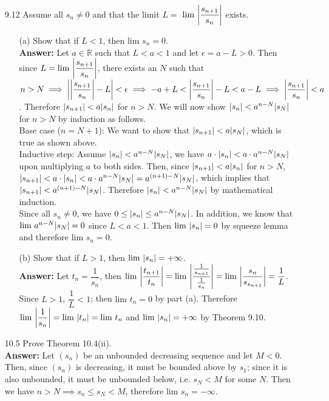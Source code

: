 \documentclass{article}
\begin{document}
\begin{itemize}
\begin{itemize}
            \end{itemize}
      \item [9.12] Assume all $s_n\neq 0$ and that the limit $L=$ $\text{lim }\abs{\dfrac{s_{n+1}}{s_n}}$ exists.
            \begin{itemize}
                  \item [(a)] Show that if $L<1$, then $\text{lim }s_n=0$.\\
                  \textbf{Answer: } Let $a\in\mathbb{R}$ such that $L<a<1$ and let $\epsilon=a-L>0$. Then since $L=\text{lim }\abs{\dfrac{s_{n+1}}{s_n}}$, there exists an $N$ such that $n>N\implies\abs{\abs{\dfrac{s_{n+1}}{s_n}}-L}<\epsilon\implies -a+L<\abs{\dfrac{s_{n+1}}{s_n}}-L<a-L\implies\abs{\dfrac{s_{n+1}}{s_n}}<a$. Therefore $\abs{s_{n+1}}<a\abs{s_n}$ for $n>N$. We will now show $\abs{s_n}<a^{n-N}\abs{s_N}$ for $n>N$ by induction as follows.\\
                  Base case ($n=N+1$): We want to show that $\abs{s_{n+1}}<a\abs{s_N}$, which is true as shown above.\\
                  Inductive step: Assume $\abs{s_n}<a^{n-N}\abs{s_N}$, we have $a\cdot\abs{s_n}<a\cdot a^{n-N}\abs{s_N}$ upon multiplying $a$ to both sides. Then, since $\abs{s_{n+1}}<a\abs{s_n}$ for $n>N$, $\abs{s_{n+1}}<a\cdot\abs{s_n}<a\cdot a^{n-N}\abs{s_N}=a^{(n+1)-N}\abs{s_N}$, which implies that $\abs{s_{n+1}}<a^{(n+1)-N}\abs{s_N}$. Therefore $\abs{s_n}<a^{n-N}\abs{s_N}$ by mathematical induction.\\
                  Since all $s_n\neq 0$, we have $0\leq\abs{s_n}\leq a^{n-N}\abs{s_N}$. In addition, we know that $\text{lim }a^{n-N}\abs{s_N}=0$ since $L<a<1$. Then $\text{lim }\abs{s_n}=0$ by squeeze lemma and therefore $\text{lim }s_n=0$.
                  \item [(b)] Show that if $L>1$, then $\text{lim }\abs{s_n}=+\infty$.\\
                  \textbf{Answer: } Let $t_n=\dfrac{1}{s_n}$, then $\text{lim }\abs{\dfrac{t_{n+1}}{t_n}}=\text{lim }\abs{\dfrac{\frac{1}{s_{n+1}}}{\frac{1}{s_n}}}=\text{lim }\abs{\dfrac{s_n}{s_{s_{n+1}}}}=\dfrac{1}{L}$. Since $L>1$, $\dfrac{1}{L}<1$; then $\text{lim }t_n=0$ by part (a). Therefore $\text{lim }\abs{\dfrac{1}{s_n}}=\text{lim }\abs{t_n}=\text{lim }t_n$ and $\text{lim }\abs{s_n}=+\infty$ by Theorem 9.10.
            \end{itemize}
      \item [10.5] Prove Theorem 10.4(ii).\\
      \textbf{Answer: } Let $(s_n)$ be an unbounded decreasing sequence and let $M<0$. Then, since $(s_n)$ is decreasing, it must be bounded above by $s_1$; since it is also unbounded, it must be unbounded below, i.e. $s_N<M$ for some $N$. Then we have $n>N\implies s_n\leq s_N<M$, therefore $\text{lim }s_n=-\infty$.

\end{itemize}
\end{document}
